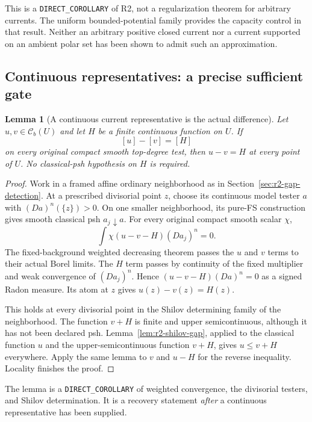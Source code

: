 \documentclass[11pt,a4paper]{article}
\numberwithin{equation}{section}
\newtheorem{lemma}[theorem]{Lemma}
\theoremstyle{definition}
\theoremstyle{remark}
\newcommand{\Cb}{\mathcal C_b}
\begin{document}
This is a \texttt{DIRECT\_COROLLARY} of R2, not a regularization
theorem for arbitrary currents. The uniform bounded-potential
family provides the capacity control in that result. Neither an
arbitrary positive closed current nor a current supported on an
ambient polar set has been shown to admit such an approximation.

\subsection{Continuous representatives: a precise sufficient gate}

\begin{lemma}[A continuous current representative is the actual difference]
\label{lem:r3-continuous-representative-actual}
Let $u,v\in\Cb(U)$ and let $H$ be a finite continuous function
on $U$. If
\[
 [u]-[v]=[H]
\]
on every original compact smooth top-degree test, then
$u-v=H$ at every point of $U$.
No classical-psh hypothesis on $H$ is required.
\end{lemma}

\begin{proof}
Work in a framed affine ordinary neighborhood as in
Section~\ref{sec:r2-gap-detection}. At a prescribed divisorial
point $z$, choose its continuous model tester $a$ with
$(Da)^n(\{z\})>0$. On one smaller neighborhood, its pure-FS
construction gives smooth classical psh $a_j\downarrow a$.
For every original compact smooth scalar $\chi$,
\[
 \int \chi(u-v-H)(Da_j)^n=0.
\]
The fixed-background weighted decreasing theorem passes the
$u$ and $v$ terms to their actual Borel limits. The $H$ term
passes by continuity of the fixed multiplier and weak convergence
of $(Da_j)^n$. Hence
$(u-v-H)(Da)^n=0$ as a signed Radon measure. Its atom at $z$
gives $u(z)-v(z)=H(z)$.

This holds at every divisorial point in the Shilov determining
family of the neighborhood. The function $v+H$ is finite and
upper semicontinuous, although it has not been declared psh.
Lemma~\ref{lem:r2-shilov-gap}, applied to the classical function
$u$ and the upper-semicontinuous function $v+H$, gives
$u\leq v+H$ everywhere. Apply the same lemma to $v$ and
$u-H$ for the reverse inequality. Locality finishes the proof.
\end{proof}

The lemma is a \texttt{DIRECT\_COROLLARY} of weighted convergence,
the divisorial testers, and Shilov determination. It is a recovery
statement \emph{after} a continuous representative has been supplied.
\end{document}
